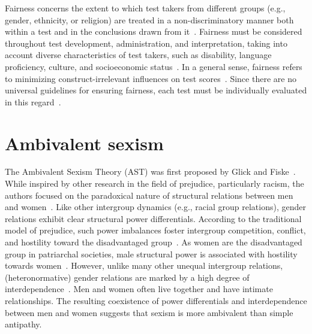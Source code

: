 \documentclass{DESSThesis}
\begin{document}
Fairness concerns the extent to which test takers from different groups (e.g., gender, ethnicity, or religion) are treated  in a non-discriminatory manner both within a test and in the conclusions drawn from it~\cite{moosbrugger_testtheorie_2020}. Fairness must be considered throughout test development, administration, and interpretation, taking into account diverse characteristics of test takers, such as disability, language proficiency, culture, and socioeconomic status~\cite{american_educational_research_association_standards_2014}. In a general sense, fairness refers to minimizing construct-irrelevant influences on test scores~\cite{american_educational_research_association_standards_2014, lohn_is_2024}. Since there are no universal guidelines for ensuring fairness, each test must be individually evaluated in this regard~\cite{moosbrugger_testtheorie_2020}.



\section{Ambivalent sexism}

The Ambivalent Sexism Theory (AST) was first proposed by Glick and Fiske~\cite{glick_ambivalent_1996, glick_hostile_1997}. While inspired by other research in the field of prejudice, particularly racism, the authors focused on the paradoxical nature of structural relations between men and women~\cite{glick_ambivalent_2011, glick_hostile_1997}. 
Like other intergroup dynamics (e.g., racial group relations), gender relations exhibit clear structural power differentials. According to the traditional model of prejudice, such power imbalances foster intergroup competition, conflict, and hostility toward the disadvantaged group~\cite{allport_nature_1954}. As women are the disadvantaged group in patriarchal societies, male structural power is associated with hostility towards women~\cite{bareket_systematic_2023, glick_hostile_1997}. 
However, unlike many other unequal intergroup relations, (heteronormative) gender relations are marked by a high degree of interdependence~\cite{fiske_prejudices_2017}. Men and women often live together and have intimate relationships. The resulting coexistence of power differentials and interdependence between men and women suggests that sexism is more ambivalent than simple antipathy.
\end{document}
